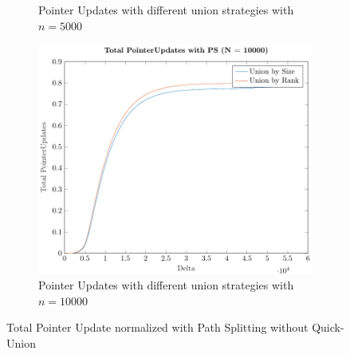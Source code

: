 \begin{figure}[ht]
\begin{subfigure}{0.32\textwidth}
        \caption{Pointer Updates with different union strategies with $n = 5000$}
    \end{subfigure}%
    \hfill
    \begin{subfigure}{0.32\textwidth}
        \centering
        \includegraphics[width=\textwidth]{../images/plotPSNonFull10000_PointerUpdates.pdf}
        \caption{Pointer Updates with different union strategies with $n = 10000$}
    \end{subfigure}

    \caption{Total Pointer Update normalized with Path Splitting without Quick-Union}
    \label{fig:tpuPSNoQU}
\end{figure}
